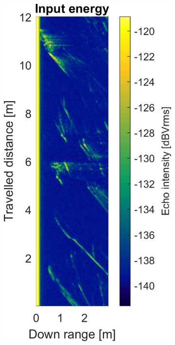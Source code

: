 \begin{figure}[htbp]
    \centering
    \begin{subfigure}[t]{0.475\linewidth}
        \centering
        \includegraphics[width=\linewidth,max height=.475\textheight]{gfx/results/indoorswimmingpool_input.png}

\end{subfigure}
\end{figure}
